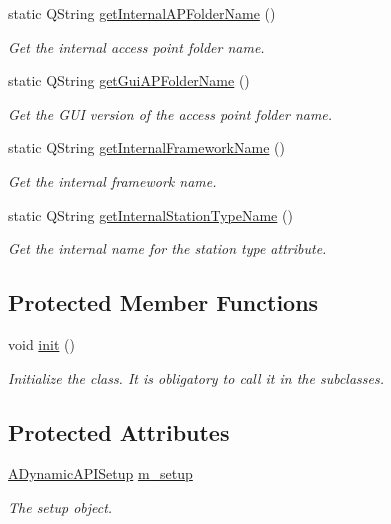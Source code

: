 \begin{DoxyCompactItemize}
static Q\+String \hyperlink{classV2XFramework_ad01858d5856b2c609a340fd6a093cf49}{get\+Internal\+A\+P\+Folder\+Name} ()
\begin{DoxyCompactList}\small\item\em Get the internal access point folder name. \end{DoxyCompactList}\item 
static Q\+String \hyperlink{classV2XFramework_a266c7971eb8d8ebdbd7c82bc81ed4d26}{get\+Gui\+A\+P\+Folder\+Name} ()
\begin{DoxyCompactList}\small\item\em Get the G\+UI version of the access point folder name. \end{DoxyCompactList}\item 
static Q\+String \hyperlink{classV2XFramework_a3f74007c455d6d179f27c474a255d7dd}{get\+Internal\+Framework\+Name} ()
\begin{DoxyCompactList}\small\item\em Get the internal framework name. \end{DoxyCompactList}\item 
static Q\+String \hyperlink{classV2XFramework_a06e4bd6b250717b27b2109281d096661}{get\+Internal\+Station\+Type\+Name} ()
\begin{DoxyCompactList}\small\item\em Get the internal name for the station type attribute. \end{DoxyCompactList}\end{DoxyCompactItemize}
\subsection*{Protected Member Functions}
\begin{DoxyCompactItemize}
\item 
void \hyperlink{classV2XFramework_a9293e0d83186b1a5ae8c48bdd41865d8}{init} ()\hypertarget{classV2XFramework_a9293e0d83186b1a5ae8c48bdd41865d8}{}\label{classV2XFramework_a9293e0d83186b1a5ae8c48bdd41865d8}

\begin{DoxyCompactList}\small\item\em Initialize the class. It is obligatory to call it in the subclasses. \end{DoxyCompactList}\end{DoxyCompactItemize}
\subsection*{Protected Attributes}
\begin{DoxyCompactItemize}
\item 
\hyperlink{classADynamicAPISetup}{A\+Dynamic\+A\+P\+I\+Setup} \hyperlink{classV2XFramework_afe850cb43d6e5812c203dd1d149f3736}{m\+\_\+setup}\hypertarget{classV2XFramework_afe850cb43d6e5812c203dd1d149f3736}{}\label{classV2XFramework_afe850cb43d6e5812c203dd1d149f3736}

\begin{DoxyCompactList}\small\item\em The setup object. \end{DoxyCompactList}\end{DoxyCompactItemize}


